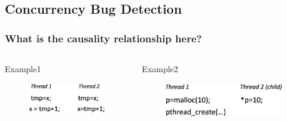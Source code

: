 % 
% 
% 
% 
\subsection{Concurrency Bug Detection} %
\begin{frame}[fragile]
    \frametitle{What is the causality relationship here?}
    \begin{columns}
    \begin{column}{0.5\textwidth}
        Example1

        \begin{figure}
        \includegraphics[width=0.7\linewidth]{figs/data-race-example-1.png}
        \end{figure}
        
	\end{column} \pause
    \begin{column}{0.5\textwidth}

        Example2

    \begin{figure}
    \includegraphics[width=0.85\linewidth]{figs/data-race-example-2.png}
    \end{figure}

\end{column}
	\end{columns}
\end{frame}
